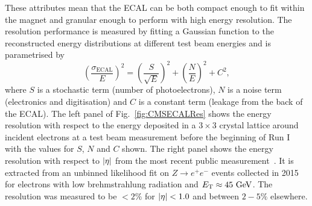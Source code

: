 These attributes mean that the ECAL can be both compact enough to fit within the magnet and granular enough to perform with high energy resolution.
The resolution performance is measured by fitting a Gaussian function to the reconstructed energy distributions at different test beam energies and is parametrised by
\begin{equation} \label{eq:ECALRes}
	\left(\frac{\sigma_{\mathrm{ECAL}}}{E}\right)^{2} = \left(\frac{S}{\sqrt{E}}\right)^{2} + \left(\frac{N}{E}\right)^{2} + C^{2},
\end{equation}
where $S$ is a stochastic term (number of photoelectrons), $N$ is a noise term (electronics and digitisation) and $C$ is a constant term (leakage from the back of the ECAL).
The left panel of Fig.~\ref{fig:CMSECALRes} shows the energy resolution with respect to the energy deposited in a $3\times3$ crystal lattice around incident electrons at a test beam measurement before the beginning of Run I with the values for $S$, $N$ and $C$ shown. 
The right panel shows the energy resolution with respect to $\lvert \eta \rvert$ from the most recent public measurement~\cite{CMSECALRESMEAS}.
It is extracted from an unbinned likelihood fit on $Z\rightarrow e^{+}e^{-}$ events collected in 2015 for electrons with low brehmstrahlung radiation and $E_{\mathrm{T}}\approx45\mathrm{~Ge\hspace{-.08em}V}^{}$.
The resolution was measured to be $<2\%$ for $\lvert \eta \rvert<1.0$ and between $2-5\%$ elsewhere.

